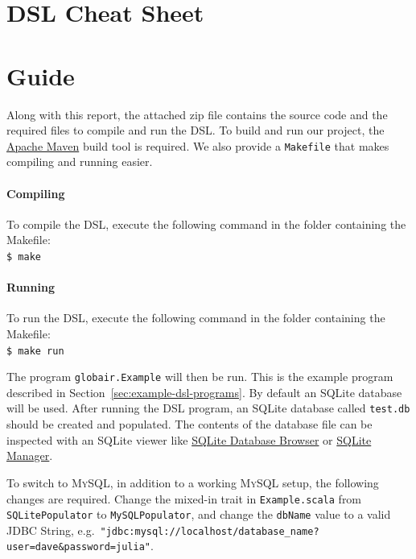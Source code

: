 \documentclass[a4paper]{article}
\newcommand{\cc}[1]{\texttt{#1}}
\renewcommand{\sc}[1]{\lstinline{#1}}
\begin{document}
\clearpage
\section{DSL Cheat Sheet}
\label{sec: cheat-sheet}




\clearpage
\section{Guide}
\label{sec:guide}


Along with this report, the attached zip file contains the source code and the required files to compile and run the DSL\@.
To build and run our project, the \href{http://maven.apache.org/}{Apache Maven} build tool is required.
We also provide a \cc{Makefile} that makes compiling and running easier.

\paragraph{Compiling}
To compile the DSL, execute the following command in the folder containing the Makefile:\\
\cc{\$ make}

\paragraph{Running}
To run the DSL, execute the following command in the folder containing the Makefile:\\
\cc{\$ make run}

The program \cc{globair.Example} will then be run.
This is the example program described in Section~\ref{sec:example-dsl-programs}.
By default an SQLite database will be used.
After running the DSL program, an SQLite database called \cc{test.db} should be created and populated.
The contents of the database file can be inspected with an SQLite viewer like \href{http://sourceforge.net/projects/sqlitebrowser/}{SQLite Database Browser} or \href{https://addons.mozilla.org/en-us/firefox/addon/sqlite-manager/}{SQLite Manager}.

To switch to \textsc{MySQL}, in addition to a working \textsc{MySQL} setup, the following changes are required.
Change the mixed-in trait in \cc{Example.scala} from \cc{SQLite\-Populator} to \cc{MySQL\-Populator}, and change the \sc{dbName} value to a valid JDBC String, e.g.\ {\color{Thistle}\cc{"jdbc:mysql://localhost/database\_name?user=dave\&password=julia"}}.
\end{document}
